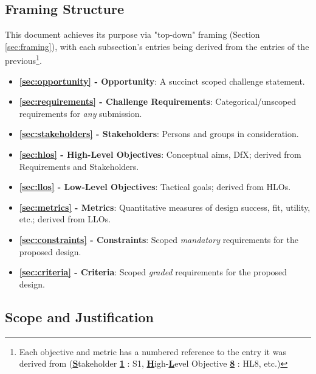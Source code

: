 \documentclass{report}
\begin{document}
\subsection{Framing Structure}
\label{sec:structure}

This document achieves its purpose via "top-down" framing (Section \ref{sec:framing}), with each subsection's entries being derived from the entries of the
previous\footnote{Each objective and metric has a numbered reference to the entry it was derived from (\uline{\textbf{S}}takeholder \uline{\textbf{1}} : S1, \uline{\textbf{H}}igh-\uline{\textbf{L}}evel Objective \uline{\textbf{8}} : HL8, etc.)}.
\begin{itemize}
    \item \textbf{\ref{sec:opportunity} - Opportunity}: A succinct scoped challenge statement.
    \item \textbf{\ref{sec:requirements} - Challenge Requirements}: Categorical/unscoped requirements for \textit{any} submission.
    \item \textbf{\ref{sec:stakeholders} - Stakeholders}: Persons and groups in consideration.
    \item \textbf{\ref{sec:hlos} - High-Level Objectives}: Conceptual aims, DfX; derived from Requirements and Stakeholders.
    \item \textbf{\ref{sec:llos} - Low-Level Objectives}: Tactical goals; derived from HLOs.
    \item \textbf{\ref{sec:metrics} - Metrics}: Quantitative measures of design success, fit, utility, etc.; derived from LLOs.
    \item \textbf{\ref{sec:constraints} - Constraints}: Scoped \textit{mandatory} requirements for the proposed design.
    \item \textbf{\ref{sec:criteria} - Criteria}: Scoped \textit{graded} requirements for the proposed design.
\end{itemize}


\newpage

\subsection{Scope and Justification}
\label{sec:scope}
\end{document}
